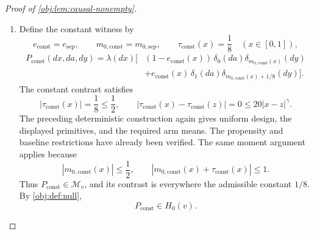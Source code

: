 \begin{proof}[Proof of \cref{obj:lem:causal-nonempty}]
\begin{enumerate}
\item Define the constant witness by
\[
e_{\mathrm{const}}=e_{\mathrm{sep}},
\qquad
m_{0,\mathrm{const}}=m_{0,\mathrm{sep}},
\qquad
\tau_{\mathrm{const}}(x)=\frac18
\quad(x\in[0,1]),
\]
\[
\begin{aligned}
P_{\mathrm{const}}(dx,da,dy)
=\lambda(dx)\bigl[
 &(1-e_{\mathrm{const}}(x))\,
 \delta_0(da)\delta_{m_{0,\mathrm{const}}(x)}(dy)\\
 &+e_{\mathrm{const}}(x)\,
 \delta_1(da)\delta_{m_{0,\mathrm{const}}(x)+1/8}(dy)
\bigr].
\end{aligned}
\]
The constant contrast satisfies
\[
|\tau_{\mathrm{const}}(x)|=\frac18\le\frac12,
\qquad
|\tau_{\mathrm{const}}(x)-\tau_{\mathrm{const}}(z)|
=0\le20|x-z|^\gamma.
\]
The preceding deterministic construction again gives uniform design, the displayed primitives, and the required arm means. The propensity and baseline restrictions have already been verified. The same moment argument applies because
\[
|m_{0,\mathrm{const}}(x)|\le\frac12,
\qquad
|m_{0,\mathrm{const}}(x)+\tau_{\mathrm{const}}(x)|\le1.
\]
Thus \(P_{\mathrm{const}}\in\mathcal M_v\), and its contrast is everywhere the admissible constant \(1/8\). By \cref{obj:def:null},
\[
P_{\mathrm{const}}\in H_0(v).
\]


\end{enumerate}
\end{proof}
